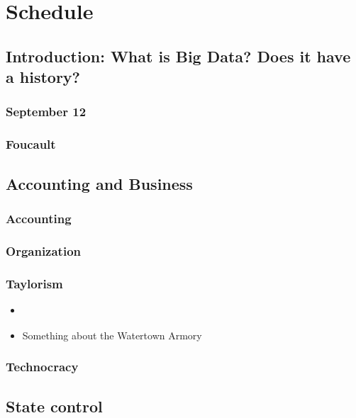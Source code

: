 \section{Schedule}

\subsection{Introduction: What is Big Data? Does it have a history?}

\subsubsection{September 12}

\subsubsection{Foucault}

\cite[Chapters ???]{foucault_discipline_1977}

\subsection{Accounting and Business}

\subsubsection{Accounting}

\subsubsection{Organization}

\subsubsection{Taylorism}

\begin{itemize}
\itemsep1pt\parskip0pt
\item
  \cite{taylor_principles_2006}
\item
  Something about the Watertown Armory
\end{itemize}

\subsubsection{Technocracy}

\subsection{State control}

